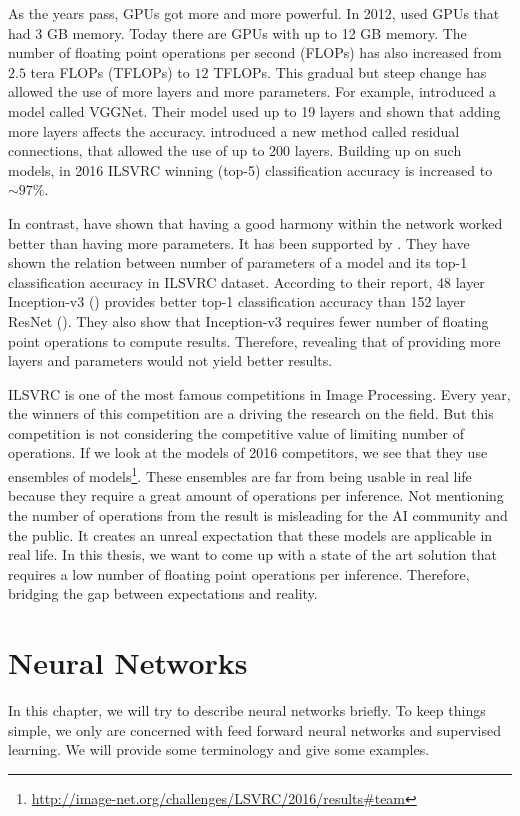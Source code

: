 As the years pass, GPUs got more and more powerful. In 2012, \cite{krizhevsky2012imagenet} used GPUs that had 3 GB memory. Today there are GPUs with up to 12 GB memory. The number of floating point operations per second (FLOPs) has also increased from $2.5$ tera FLOPs (TFLOPs) to $12$ TFLOPs. This gradual but steep change has allowed the use of more layers and more parameters. For example, \cite{Simonyan:2014aa} introduced a model called VGGNet. Their model used up to 19 layers and shown that adding more layers affects the accuracy. \cite{He:2015aa} introduced a new method called residual connections, that allowed the use of up to 200 layers. Building up on such models, in 2016 ILSVRC winning (top-5) classification accuracy is increased to $\sim 97\%$. 

In contrast, \cite{Szegedy:2014aa} have shown that having a good harmony within the network worked better than having more parameters. It has been supported by \cite{Canziani:2016aa}. They have shown the relation between number of parameters of a model and its top-1 classification accuracy in ILSVRC dataset. According to their report, 48 layer Inception-v3 (\cite{Szegedy_2016_CVPR}) provides better top-1 classification accuracy than 152 layer ResNet (\cite{He:2015aa}). They also show that Inception-v3 requires fewer number of floating point operations to compute results. Therefore, revealing that of providing more layers and parameters would not yield better results. 

ILSVRC is one of the most famous competitions in Image Processing. Every year, the winners of this competition are a driving the research on the field. But this competition is not considering the competitive value of limiting number of operations. If we look at the models of 2016 competitors, we see that they use ensembles of models\footnote{\url{http://image-net.org/challenges/LSVRC/2016/results\#team}}. These ensembles are far from being usable in real life because they require a great amount of operations per inference. Not mentioning the number of operations from the result is misleading for the AI community and the public. It creates an unreal expectation that these models are applicable in real life. In this thesis, we want to come up with a state of the art solution that requires a low number of floating point operations per inference. Therefore, bridging the gap between expectations and reality.

\section{Neural Networks}
In this chapter, we will try to describe neural networks briefly. To keep things simple, we only are concerned with feed forward neural networks and supervised learning. We will provide some terminology and give some examples. 

